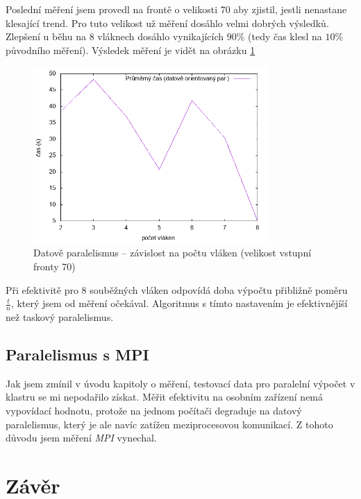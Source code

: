 \documentclass[czech]{article}
\begin{document}
Poslední měření jsem provedl na frontě o velikosti 70 aby zjistil, jestli nenastane klesající trend.
Pro tuto velikost už měření dosáhlo velmi dobrých výsledků.
Zlepšení u běhu na 8 vláknech dosáhlo vynikajících $90\%$ (tedy čas klesl na $10\%$ původního měření).
Výsledek měření je vidět na obrázku \ref{fig:data-2}

\begin{figure}[H]
    \centering
    \includegraphics[width=0.8\textwidth]{assets/parallel-data-oriented-2.png}
    \caption{Datově paralelismus -- závislost na počtu vláken (velikost vstupní fronty 70)}
    \label{fig:data-2}
\end{figure}

Při efektivitě pro 8 souběžných vláken odpovídá doba výpočtu přibližně poměru $\frac{t}{n}$, který jsem od měření očekával.
Algoritmus s tímto nastavením je efektivnějíší než taskový paralelismus.

\subsection{Paralelismus s MPI}

Jak jsem zmínil v úvodu kapitoly o měření, testovací data pro paralelní výpočet v klastru se mi nepodařilo získat.
Měřit efektivitu na osobním zařízení nemá vypovídací hodnotu, protože na jednom počítači degraduje na datový paralelismus, který je ale navíc zatížen meziprocesovou komunikací.
Z tohoto důvodu jsem měření \textit{MPI} vynechal.

\section{Závěr}
\end{document}
